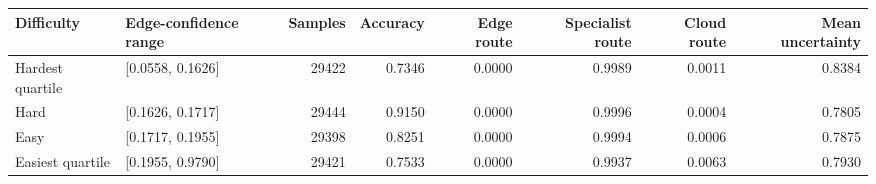 \begin{tabular}{llrrrrrr}
\toprule
Difficulty & Edge-confidence range & Samples & Accuracy & Edge route & Specialist route & Cloud route & Mean uncertainty \\
\midrule
Hardest quartile & [0.0558, 0.1626] & 29422 & 0.7346 & 0.0000 & 0.9989 & 0.0011 & 0.8384 \\
Hard & [0.1626, 0.1717] & 29444 & 0.9150 & 0.0000 & 0.9996 & 0.0004 & 0.7805 \\
Easy & [0.1717, 0.1955] & 29398 & 0.8251 & 0.0000 & 0.9994 & 0.0006 & 0.7875 \\
Easiest quartile & [0.1955, 0.9790] & 29421 & 0.7533 & 0.0000 & 0.9937 & 0.0063 & 0.7930 \\
\bottomrule
\end{tabular}
